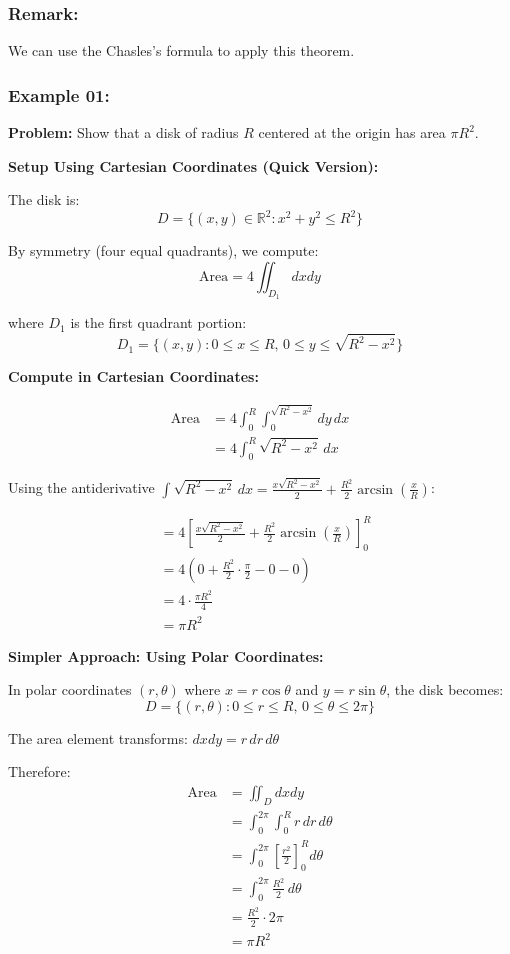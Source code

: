 \subsubsection{Remark:}
We can use the Chasles's formula to apply this theorem.

\subsubsection{Example 01:}
\textbf{Problem:} Show that a disk of radius $R$ centered at the origin has area $\pi R^2$.
 
\textbf{Setup Using Cartesian Coordinates (Quick Version):}
 
The disk is:
\[
D = \{(x,y) \in \mathbb{R}^2 : x^2 + y^2 \leq R^2\}
\]
 
By symmetry (four equal quadrants), we compute:
\[
\text{Area} = 4 \iint_{D_1} dxdy
\]
 
where $D_1$ is the first quadrant portion:
\[
D_1 = \{(x,y) : 0 \leq x \leq R, \, 0 \leq y \leq \sqrt{R^2-x^2}\}
\]
 
\textbf{Compute in Cartesian Coordinates:}
 
\begin{align*}
\text{Area} &= 4\int_0^R \int_0^{\sqrt{R^2-x^2}} dy \, dx \\[0.5em]
&= 4\int_0^R \sqrt{R^2-x^2} \, dx
\end{align*}
 
Using the antiderivative $\int \sqrt{R^2-x^2} \, dx = \frac{x\sqrt{R^2-x^2}}{2} + \frac{R^2}{2}\arcsin\left(\frac{x}{R}\right)$:
 
\begin{align*}
&= 4\left[\frac{x\sqrt{R^2-x^2}}{2} + \frac{R^2}{2}\arcsin\left(\frac{x}{R}\right)\right]_0^R \\[0.5em]
&= 4\left(0 + \frac{R^2}{2} \cdot \frac{\pi}{2} - 0 - 0\right) \\[0.5em]
&= 4 \cdot \frac{\pi R^2}{4} \\[0.5em]
&= \pi R^2
\end{align*}
 
\textbf{Simpler Approach: Using Polar Coordinates:}
 
In polar coordinates $(r, \theta)$ where $x = r\cos\theta$ and $y = r\sin\theta$, the disk becomes:
\[
D = \{(r,\theta) : 0 \leq r \leq R, \, 0 \leq \theta \leq 2\pi\}
\]
 
The area element transforms: $dxdy = r \, dr \, d\theta$
 
Therefore:
\begin{align*}
\text{Area} &= \iint_D dxdy \\[0.5em]
&= \int_0^{2\pi} \int_0^R r \, dr \, d\theta \\[0.5em]
&= \int_0^{2\pi} \left[\frac{r^2}{2}\right]_0^R d\theta \\[0.5em]
&= \int_0^{2\pi} \frac{R^2}{2} \, d\theta \\[0.5em]
&= \frac{R^2}{2} \cdot 2\pi \\[0.5em]
&= \pi R^2
\end{align*}
 
